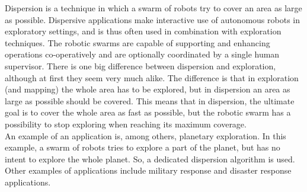 
Dispersion is a technique in which a swarm of robots try to cover an area as large as possible.  
Dispersive applications make interactive use of autonomous robots in exploratory settings, and is thus often used in combination with exploration techniques. 
The robotic swarms are capable of supporting and enhancing operations co-operatively and are optionally coordinated by a single human supervisor. 
There is one big difference between dispersion and exploration, although at first they seem very much alike. 
The difference is that in exploration (and mapping) the whole area has to be explored, but in dispersion an area as large as possible should be covered. 
This means that in dispersion, the ultimate goal is to cover the whole area as fast as possible, but the robotic swarm has a possibility to stop exploring when reaching its maximum coverage. \\

An example of an application is, among others, planetary exploration. \cite{ludwig2006robotic,Penders2011}
In this example, a swarm of robots tries to explore a part of the planet, but has no intent to explore the whole planet. 
So, a dedicated dispersion algorithm is used. 
Other examples of applications include military response and disaster response applications. 

    
